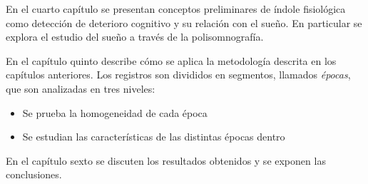 %


En el cuarto capítulo se presentan conceptos preliminares de índole fisiológica como detección de deterioro cognitivo y su relación con el sueño. En particular se explora el estudio del sueño a través de la polisomnografía.

En el capítulo quinto describe cómo se aplica la metodología descrita en los capítulos anteriores.
%
Los registros son divididos en segmentos, llamados \textit{épocas}, que son analizadas en tres niveles:
\begin{itemize}
\item Se prueba la homogeneidad de cada época
\item Se estudian las características de las distintas épocas dentro 
\end{itemize}

En el capítulo sexto se discuten los resultados obtenidos y se exponen las conclusiones.

%
%

